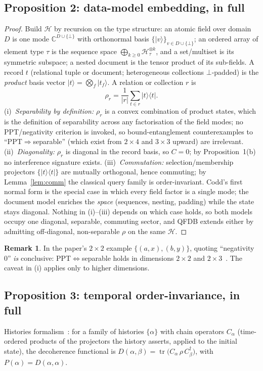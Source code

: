 \documentclass[11pt]{article}
\newcommand{\ket}[1]{\lvert #1 \rangle}
\newcommand{\bra}[1]{\langle #1 \rvert}
\newcommand{\tr}{\operatorname{tr}}
\theoremstyle{definition}
\newtheorem{qrem}{Remark}
\begin{document}
\subsection{Proposition 2: data-model embedding, in full}
\begin{proof}
Build $\mathcal H$ by recursion on the type structure: an atomic field over domain $D$ is one mode $\mathbb C^{D\cup\{\bot\}}$ with orthonormal basis $\{\ket v\}_{v\in D\cup\{\bot\}}$; an ordered array of element type $\tau$ is the sequence space $\bigoplus_{k\ge0}\mathcal H_\tau^{\otimes k}$, and a set/multiset is its symmetric subspace; a nested document is the tensor product of its sub-fields. A record $t$ (relational tuple or document; heterogeneous collections $\bot$-padded) is the \emph{product} basis vector $\ket t=\bigotimes_f \ket{t_f}$. A relation or collection $r$ is
\[
\rho_r=\frac{1}{\lvert r\rvert}\sum_{t\in r}\ket t\bra t .
\]
(i)~\emph{Separability by definition:} $\rho_r$ is a convex combination of product states, which is the definition of separability across any factorisation of the field modes; no PPT/negativity criterion is invoked, so bound-entanglement counterexamples to ``PPT$\Rightarrow$separable'' (which exist from $2\times4$ and $3\times3$ upward) are irrelevant.
(ii)~\emph{Diagonality:} $\rho_r$ is diagonal in the record basis, so $C=0$; by Proposition~1(b) no interference signature exists.
(iii)~\emph{Commutation:} selection/membership projectors $\{\ket t\bra t\}$ are mutually orthogonal, hence commuting; by Lemma~\ref{lem:comm} the classical query family is order-invariant.
Codd's first normal form is the special case in which every field factor is a single mode; the document model enriches the \emph{space} (sequences, nesting, padding) while the state stays diagonal. Nothing in (i)--(iii) depends on which case holds, so both models occupy one diagonal, separable, commuting sector, and QFDB extends either by admitting off-diagonal, non-separable $\rho$ on the same $\mathcal H$.
\end{proof}
\begin{qrem}
In the paper's $2\times2$ example $\{(a,x),(b,y)\}$, quoting ``negativity $0$'' \emph{is} conclusive: PPT$\Leftrightarrow$separable holds in dimensions $2\times2$ and $2\times3$~\cite{horodecki1996}. The caveat in (i) applies only to higher dimensions.
\end{qrem}

\subsection{Proposition 3: temporal order-invariance, in full}
Histories formalism~\cite{griffiths1984}: for a family of histories $\{\alpha\}$ with chain operators $C_\alpha$ (time-ordered products of the projectors the history asserts, applied to the initial state), the decoherence functional is $D(\alpha,\beta)=\tr\big(C_\alpha\,\rho\,C_\beta^\dagger\big)$, with $P(\alpha)=D(\alpha,\alpha)$.
\end{document}
